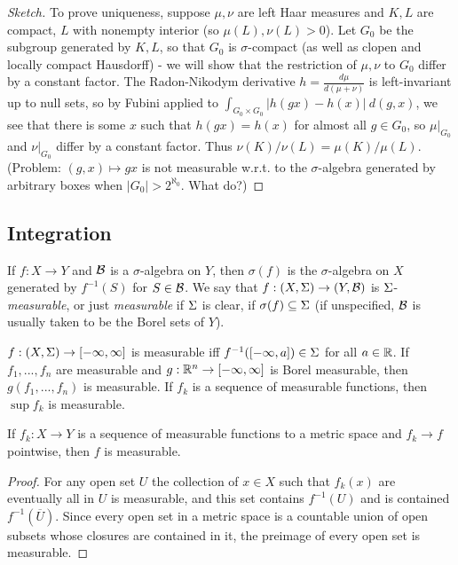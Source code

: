 \documentclass[letterpaper,11pt]{report}
\begin{document}
\begin{proof}[Sketch]
To prove uniqueness, suppose $\mu, \nu$ are left Haar measures and $K,L$ are compact, $L$ with nonempty interior (so $\mu(L), \nu(L) > 0$). Let $G_0$ be the subgroup generated by $K, L$, so that $G_0$ is $\sigma$-compact (as well as clopen and locally compact Hausdorff) - we will show that the restriction of $\mu, \nu$ to $G_0$ differ by a constant factor. The Radon-Nikodym derivative $h = \frac{d\mu}{d(\mu+\nu)}$ is left-invariant up to null sets, so by Fubini applied to $\int_{G_0\times G_0} |h(gx)-h(x)|\ d(g,x)$, we see that there is some $x$ such that $h(gx) = h(x)$ for almost all $g \in G_0$, so $\mu|_{G_0}$ and $\nu|_{G_0}$ differ by a constant factor. Thus $\nu(K)/\nu(L) = \mu(K)/\mu(L)$. (Problem: $(g,x) \mapsto gx$ is not measurable w.r.t. to the $\sigma$-algebra generated by arbitrary boxes when $|G_0| > 2^{\aleph_0}$. What do?)
\end{proof}

\subsection{Integration}

\begin{defn} If $f:X\rightarrow Y$ and $\mathcal{B}$ is a $\sigma$-algebra on $Y$, then $\sigma(f)$ is the $\sigma$-algebra on $X$ generated by $f^{-1}(S)$ for $S \in \mathcal{B}$. We say that $f:(X,\Sigma) \rightarrow (Y,\mathcal{B})$ is $\Sigma$-\emph{measurable}, or just \emph{measurable} if $\Sigma$ is clear, if $\sigma(f) \subseteq \Sigma$ (if unspecified, $\mathcal{B}$ is usually taken to be the Borel sets of $Y$).
\end{defn}

\begin{prop} $f:(X,\Sigma) \rightarrow [-\infty,\infty]$ is measurable iff $f^{-1}([-\infty,a]) \in \Sigma$ for all $a \in \mathbb{R}$. If $f_1, ..., f_n$ are measurable and $g:\mathbb{R}^n \rightarrow [-\infty,\infty]$ is Borel measurable, then $g(f_1, ..., f_n)$ is measurable. If $f_k$ is a sequence of measurable functions, then $\sup f_k$ is measurable.
\end{prop}

\begin{prop} If $f_k : X \rightarrow Y$ is a sequence of measurable functions to a metric space and $f_k \rightarrow f$ pointwise, then $f$ is measurable.
\end{prop}
\begin{proof} For any open set $U$ the collection of $x \in X$ such that $f_k(x)$ are eventually all in $U$ is measurable, and this set contains $f^{-1}(U)$ and is contained $f^{-1}(\overline{U})$. Since every open set in a metric space is a countable union of open subsets whose closures are contained in it, the preimage of every open set is measurable.
\end{proof}
\end{document}

